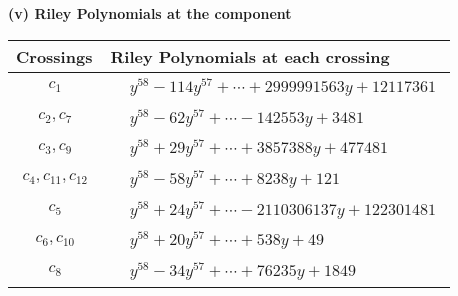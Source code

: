 \documentclass[1p]{elsarticle_modified}
\theoremstyle{definition}
\begin{document}
\flushleft \textbf{(v) Riley Polynomials at the component}\newline \\
\begin{tabular}{m{50pt}|m{274pt}}
Crossings & \hspace{64pt}Riley Polynomials at each crossing \\
\hline $$\begin{aligned}c_{1}\end{aligned}$$&$\begin{aligned}
&y^{58}-114 y^{57}+\cdots+2999991563 y+12117361
\end{aligned}$\\
\hline $$\begin{aligned}c_{2},c_{7}\end{aligned}$$&$\begin{aligned}
&y^{58}-62 y^{57}+\cdots-142553 y+3481
\end{aligned}$\\
\hline $$\begin{aligned}c_{3},c_{9}\end{aligned}$$&$\begin{aligned}
&y^{58}+29 y^{57}+\cdots+3857388 y+477481
\end{aligned}$\\
\hline $$\begin{aligned}c_{4},c_{11},c_{12}\end{aligned}$$&$\begin{aligned}
&y^{58}-58 y^{57}+\cdots+8238 y+121
\end{aligned}$\\
\hline $$\begin{aligned}c_{5}\end{aligned}$$&$\begin{aligned}
&y^{58}+24 y^{57}+\cdots-2110306137 y+122301481
\end{aligned}$\\
\hline $$\begin{aligned}c_{6},c_{10}\end{aligned}$$&$\begin{aligned}
&y^{58}+20 y^{57}+\cdots+538 y+49
\end{aligned}$\\
\hline $$\begin{aligned}c_{8}\end{aligned}$$&$\begin{aligned}
&y^{58}-34 y^{57}+\cdots+76235 y+1849
\end{aligned}$\\
\hline
\end{tabular}\\~\\
\end{document}
